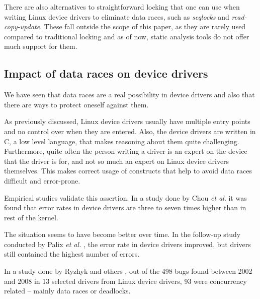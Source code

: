 \documentclass[..thesis.tex]{subfiles}
\begin{document}

There are also alternatives to straightforward locking that one can use when writing Linux device drivers to eliminate data races, such as \textit{seqlocks} and \textit{read-copy-update}. These fall outside the scope of this paper, as they are rarely used compared to traditional locking and as of now, static analysis tools do not offer much support for them. 


\subsection{Impact of data races on device drivers}

We have seen that data races are a real possibility in device drivers and also that there are ways to protect oneself against them. 


As previously discussed, Linux device drivers usually have multiple entry points and no control over when they are entered. Also, the device drivers are written in C, a low level language, that makes reasoning about them quite challenging. Furthermore, quite often the person writing a driver is an expert on the device that the driver is for, and not so much an expert on Linux device drivers themselves. This makes correct usage of constructs that help to avoid data races difficult and error-prone.




Empirical studies validate this assertion. In a study done by Chou \textit{et al}. \cite{chou_empirical_2001} it was found that error rates in device drivers are three to seven times higher than in rest of the kernel. 

The situation seems to have become better over time. In the follow-up study conducted by Palix \textit{et al.} \cite{palix_faults_2011}, the error rate in device drivers improved, but drivers still contained the highest number of errors.

In a study done by Ryzhyk and others \cite{ryzhyk_dingo_2009}, out of the 498 bugs found between 2002 and 2008 in 13 selected drivers from Linux device drivers, 93 were concurrency related -- mainly data races or deadlocks. 
\end{document}
